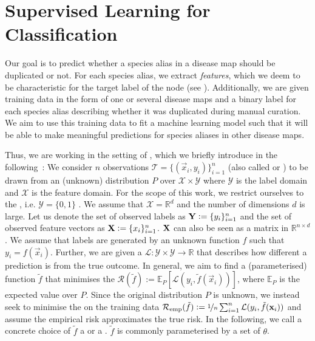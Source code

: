 \documentclass[
	fontsize=10pt, %
	twoside=false, %
	secnumdepth=1, %
  toc=indentunnumbered %
]{kaobook}
\begin{document}
\section{Supervised Learning for Classification}
\label{sec:supervised-learning}
Our goal is to predict whether a species alias in a disease map
should be duplicated or not. For each species alias, we extract 
\textit{features}, which we deem to be characteristic for the target label of
the node (see ).
Additionally, we are given training
data in the form of one or several disease maps and a binary label for each
species alias describing whether it was duplicated during manual curation. We
aim to use this training data to fit a machine learning model such that it will
be able to make meaningful predictions for species aliases in other disease
maps.

Thus, we are working in the setting of , which we
briefly introduce in the
following~\cite{vapnik_PrinciplesRiskMinimization_,bronstein_geometric_2021}:
We consider $n$ observations $\mathcal{T} = \{(\vec x_i, y_i)\}_{i=1}^n$ (also
called  or ) to be drawn from an (unknown)
distribution $P$ over $\mathcal{X} \times \mathcal{Y}$ where $\mathcal{Y}$ is
the label domain and $\mathcal{X}$ is the feature domain. For the scope of this
work, we restrict ourselves to the , i.e.
$\mathcal{Y} = \{0,1\}$ . We assume that $\mathcal{X} = \mathbb{R}^d$ and the
number of dimensions $d$ is large. Let us denote the set of
observed  labels as $\mat Y := \{y_i\}_{i=1}^n$ and the set of
observed feature vectors as $\mat X := \{x_i\}_{i=1}^n$. $\mat X$ can also be
seen as a matrix in $\mathbb{R}^{n \times d}$.
%
We assume that labels are generated by an unknown function $f$ such that $y_i
= f(\vec x_i)$.
%
Further, we are given a  $\mathcal{L} :
\mathcal{Y} \times \mathcal{Y} \rightarrow \mathbb{R}$ that describes how
different a prediction is from the true outcome.
%
In general, we aim to find a (parameterised) function $\tilde f$ that minimises
the  $\mathcal{R}(\tilde f) := \mathbb{E}_P\left[ \mathcal{L}(y_i,
    \tilde f(\vec x_i)) \right]$, where $\mathbb{E}_P$ is the expected value
over $P$.
%
Since the original distribution $P$ is unknown, we instead seek to minimise the 
  on the training data
$\mathcal{R}_{\text{emp}}(\tilde f) := \nicefrac{1}{n}
\sum_{i=1}^n \mathcal{L}(y_i, \tilde f(\vec x_i))$ and assume the empirical risk
approximates the true risk.
%
In the following, we call a concrete choice of $\tilde f$ a  or a
. $\tilde f$ is commonly parameterised by a set of 
$\theta$.
\end{document}
